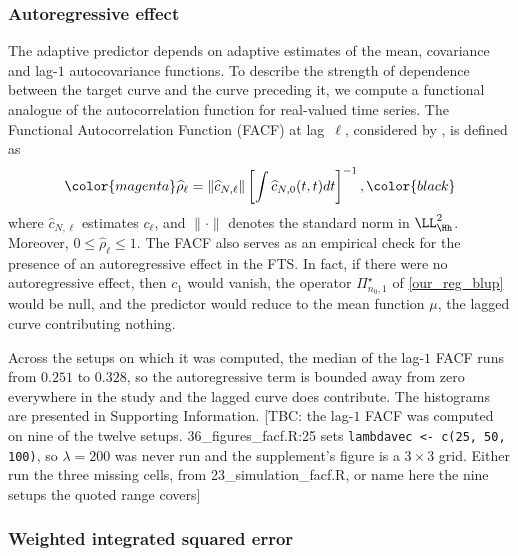 \subsubsection{\color{magenta}Autoregressive effect\color{black}}

\color{magenta}
The adaptive predictor depends on adaptive estimates of the mean, covariance and lag-$1$ autocovariance functions. To describe the strength of dependence between the target curve and the curve preceding it, we compute a functional analogue of the autocorrelation function for real-valued time series. The Functional Autocorrelation Function (FACF) at lag~$\ell$, considered by \citet{horovath_2016}, is defined as
\color{black}
\begin{equation}\label{eq:blup:facf}
	\color{magenta}\widehat{\rho}_\ell =
	\|\widehat{c}_{N,\ell}\|\left[\int \widehat{c}_{N,0}(t,t)dt\right]^{-1},\color{black}
\end{equation}
\color{magenta}
where $\widehat{c}_{N,\ell}$ estimates $c_\ell$, and $\|\cdot\|$ denotes the standard norm in $\LL^2_\Hh$. Moreover, $0 \leq \widehat{\rho}_\ell \leq 1$. The FACF also serves as an empirical check for the presence of an autoregressive effect in the FTS. In fact, if there were no autoregressive effect, then $c_1$ would vanish, the operator $\Pi_{n_0,1}^\star$ of \eqref{our_reg_blup} would be null, and the predictor would reduce to the mean function $\mu$, the lagged curve contributing nothing.

Across the setups on which it was computed, the median of the lag-$1$ FACF runs from $0.251$ to $0.328$, so the autoregressive term is bounded away from zero everywhere in the study and the lagged curve does contribute. The histograms are presented in Supporting Information.
[TBC: the lag-$1$ FACF was computed on nine of the twelve setups. 36\_figures\_facf.R:25 sets \texttt{lambdavec <- c(25, 50, 100)}, so $\lambda = 200$ was never run and the supplement's figure is a $3\times3$ grid. Either run the three missing cells, from 23\_simulation\_facf.R, or name here the nine setups the quoted range covers]
\color{black}

\subsubsection{\color{magenta}Weighted integrated squared error\color{black}}

